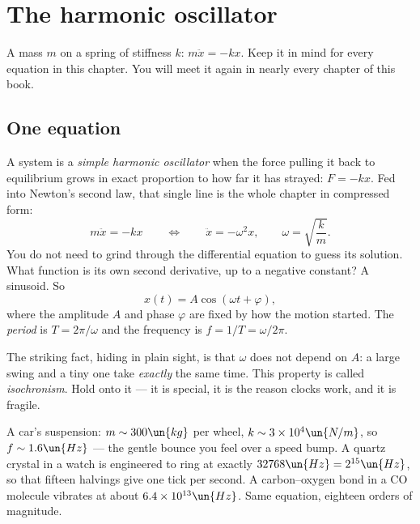 \chapter{The harmonic oscillator}
\label{ch:sho}



\begin{prototype}
A mass $m$ on a spring of stiffness $k$: $m\ddot{x}=-kx$. Keep it in mind for every equation in this chapter. You will meet it again in nearly every chapter of this book.
\end{prototype}

\section{One equation}

A system is a \emph{simple harmonic oscillator} when the force pulling it back to equilibrium grows in exact proportion to how far it has strayed: $F=-kx$. Fed into Newton's second law, that single line is the whole chapter in compressed form:
\[
  m\ddot{x}=-kx \qquad\Longleftrightarrow\qquad \ddot{x}=-\omega^{2}x,\qquad \omega=\sqrt{\frac{k}{m}}.
\]
You do not need to grind through the differential equation to guess its solution. What function is its own second derivative, up to a negative constant? A sinusoid. So
\[
  x(t)=A\cos(\omega t+\varphi),
\]
where the amplitude $A$ and phase $\varphi$ are fixed by how the motion started. The \emph{period} is $T = 2\pi/\omega$ and the frequency is $f = 1/T = \omega/2\pi$.

The striking fact, hiding in plain sight, is that $\omega$ does not depend on $A$: a large swing and a tiny one take \emph{exactly} the same time. This property is called \emph{isochronism}. Hold onto it --- it is special, it is the reason clocks work, and it is fragile.

\begin{example}
A car's suspension: $m\sim 300\un{kg}$ per wheel, $k\sim 3\times10^{4}\un{N/m}$, so $f\sim 1.6\un{Hz}$ --- the gentle bounce you feel over a speed bump. A quartz crystal in a watch is engineered to ring at exactly $32768\un{Hz} = 2^{15}\un{Hz}$, so that fifteen halvings give one tick per second. A carbon--oxygen bond in a CO molecule vibrates at about $6.4\times10^{13}\un{Hz}$. Same equation, eighteen orders of magnitude.
\end{example}

